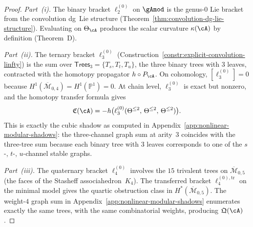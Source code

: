 \begin{proof}
\emph{Part~(i).}
The binary bracket $\ell_2^{(0)}$ on $\gAmod$ is the
genus-$0$ Lie bracket from the convolution dg~Lie
structure
(Theorem~\ref{thm:convolution-dg-lie-structure}).
Evaluating on $\Theta_\cA$ produces the scalar
curvature $\kappa(\cA)$ by definition (Theorem~D).

\emph{Part~(ii).}
The ternary bracket $\ell_3^{(0)}$
(Construction~\ref{constr:explicit-convolution-linfty})
is the sum over $\mathsf{Trees}_3 = \{T_s, T_t, T_u\}$,
the three binary trees with $3$ leaves, contracted
with the homotopy propagator $h \circ P_\cA$.
On cohomology, $[\ell_3^{(0)}] = 0$ because
$H^1(\overline{\mathcal{M}}_{0,4}) =
H^1(\mathbb{P}^1) = 0$.  At chain level,
$\ell_3^{(0)}$ is exact but nonzero, and the
homotopy transfer formula gives
\[
\mathfrak{C}(\cA)
= -h\bigl(\ell_3^{(0)}(\Theta^{\leq 2},\,
\Theta^{\leq 2},\, \Theta^{\leq 2})\bigr).
\]
This is exactly the cubic shadow as computed in
Appendix~\ref{app:nonlinear-modular-shadows}:
the three-channel graph sum at arity~$3$ coincides
with the three-tree sum because each binary tree
with $3$ leaves corresponds to one of the $s$-, $t$-,
$u$-channel stable graphs.

\emph{Part~(iii).}
The quaternary bracket $\ell_4^{(0)}$ involves the
$15$ trivalent trees on $\overline{\mathcal{M}}_{0,5}$
(the faces of the Stasheff associahedron~$K_4$).  The
transferred bracket $\ell_4^{(0),\mathrm{tr}}$ on the
minimal model gives the quartic obstruction class in
$H^*(\overline{\mathcal{M}}_{0,5})$.  The weight-$4$
graph sum in
Appendix~\ref{app:nonlinear-modular-shadows} enumerates
exactly the same trees, with the same combinatorial
weights, producing $\mathfrak{Q}(\cA)$.
\end{proof}

